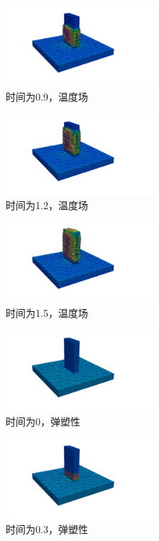 \begin{figure}[!htbp]
  \centering
  \includegraphics[height=3cm]{fig/4/4.1.6/4.1.6.14.png}
  \caption{时间为0.9，温度场}
  \label{fig:4.1.4:4}
\end{figure}

\begin{figure}[!htbp]
  \centering
  \includegraphics[height=3cm]{fig/4/4.1.6/4.1.6.15.png}
  \caption{时间为1.2，温度场}
  \label{fig:4.1.4:4}
\end{figure}

\begin{figure}[!htbp]
  \centering
  \includegraphics[height=3cm]{fig/4/4.1.6/4.1.6.16.png}
  \caption{时间为1.5，温度场}
  \label{fig:4.1.4:4}
\end{figure}

\begin{figure}[!htbp]
  \centering
  \includegraphics[height=3cm]{fig/4/4.1.6/4.1.6.5.png}
  \caption{时间为0，弹塑性}
  \label{fig:4.1.4:4}
\end{figure}

\begin{figure}[!htbp]
  \centering
  \includegraphics[height=3cm]{fig/4/4.1.6/4.1.6.6.png}
  \caption{时间为0.3，弹塑性}
  \label{fig:4.1.4:4}
\end{figure}

